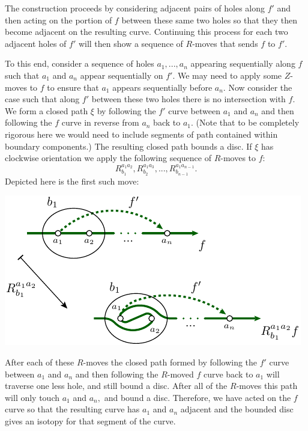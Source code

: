 The construction proceeds by considering adjacent
pairs of holes along $f'$ and then acting on the
portion of $f$ between these same two holes so that
they then become adjacent on the resulting curve.
Continuing this
process for each two adjacent holes of $f'$ will then
show a sequence of $R$-moves that sends $f$ to $f'.$

To this end, consider a sequence of holes $a_1,...,a_n$
appearing sequentially along $f$
such that $a_1$ and $a_n$ appear sequentially on $f'.$
We may need to apply some $Z$-moves to $f$ to ensure
that $a_1$ appears sequentially before $a_n$.
Now consider the case such that
along $f'$ between these two holes there is
no intersection with $f.$
We form a closed path $\xi$ by
following the $f'$ curve between $a_1$ and $a_n$ and then
following the $f$ curve in reverse from $a_n$ back to $a_1.$
(Note that to be completely rigorous here we would need to include segments
of path contained within boundary components.)
The resulting closed path bounds a disc.
If $\xi$ has clockwise orientation %
we apply the following sequence of $R$-moves to $f$:
$$
    R^{a_1a_2}_{b_1}, R^{a_1a_3}_{b_2}, ..., R^{a_1a_{n-1}}_{b_{n-1}}.
$$
Depicted here is the first such move:
\begin{center}
\includegraphics[]{pic-theorem.pdf}
\end{center}
After each of these $R$-moves the closed path
formed by 
following the $f'$ curve between $a_1$ and $a_n$ and then
following the $R$-moved $f$ curve back to $a_1$ will
traverse one less hole, and still bound a disc.
After all of the $R$-moves this path will only
touch $a_1$ and $a_n,$ and bound a disc.
Therefore, we have acted on the $f$ curve so that
the resulting curve has $a_1$ and $a_n$ adjacent
and the bounded disc gives an isotopy for that
segment of the curve.


